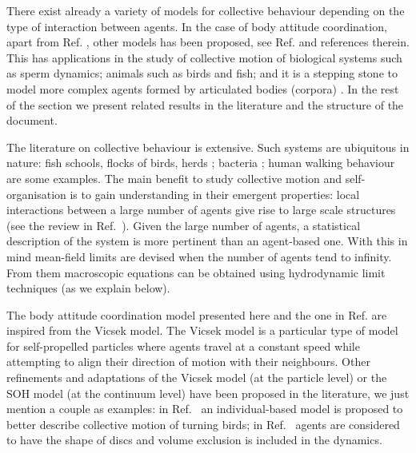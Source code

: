 \documentclass[12pt]{article}
\begin{document}
\medskip

There exist already a variety of models for collective behaviour depending on the type of interaction between agents. In the case of body attitude coordination, apart from Ref. \cite{bodyattitude},  other models has been proposed, see Ref. \cite{sarlette2009autonomous} and references therein.  This has applications in the study of collective motion of biological systems such as sperm dynamics; animals such as birds and fish; and it is a stepping stone to model more complex agents formed by articulated bodies (corp\-ora) \cite{constantin2010onsager,constantin2010high}. In the rest of the section we present related results in the literature and the structure of the document. 

\bigskip

The literature on collective behaviour is extensive. Such systems are ubiquitous in nature: fish schools, flocks of birds, herds \cite{buhl2006disorder,cavagna2010scale,parrish1997animal}; bacteria \cite{ben2000cooperative,zhang2010collective}; human walking behaviour \cite{helbing2007dynamics} are some examples.
The main benefit to study collective motion and self-organisation is to gain understanding in their emergent properties: local interactions between a large number of agents give rise to large scale structures (see the review in Ref.~\cite{vicsek2012collective}). Given the large number of agents, a statistical description of the system is more pertinent than an agent-based one. With this in mind mean-field limits are devised when the number of agents tend to infinity. From  them macroscopic equations can be obtained using hydrodynamic limit techniques (as we explain below). 




\medskip


The body attitude coordination model presented here and the one in Ref. \cite{bodyattitude} are inspired from the Vicsek model. The Vicsek model is a particular type of model for self-propelled particles \cite{aldana2003phase,couzin2002collective,gregoire2004onset,vicsek1995novel} where agents travel at a constant speed while attempting to align their direction of motion with their neighbours.
  Other refinements and adaptations of the Vicsek model (at the particle level) or the SOH model (at the continuum level) have been proposed in the literature, we just mention a couple as examples: in Ref.~\cite{cavagna2014flocking} an individual-based model is proposed to better describe collective motion of turning birds; in Ref.~\cite{degond2015multi} agents are considered to have the shape of discs and volume exclusion is included in the dynamics. 
 
\end{document}

